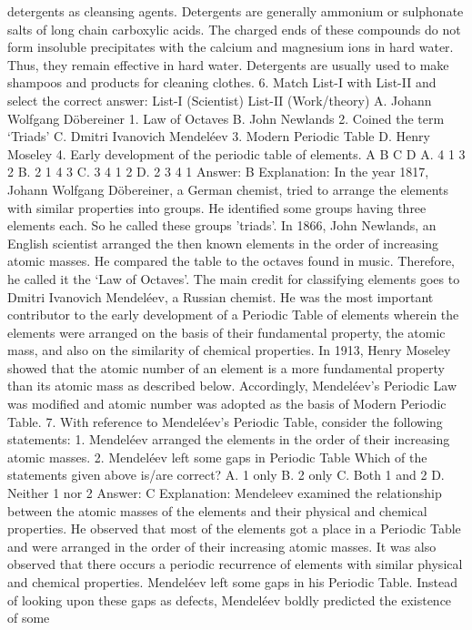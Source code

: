 detergents as cleansing agents. Detergents are generally ammonium
or sulphonate salts of long chain carboxylic acids. The charged ends
of these compounds do not form insoluble precipitates with the
calcium and magnesium ions in hard water. Thus, they remain
effective in hard water. Detergents are usually used to make
shampoos and products for cleaning clothes.
6. Match List-I with List-II and select the correct answer:
List-I (Scientist) List-II (Work/theory)
A. Johann Wolfgang Döbereiner 1. Law of Octaves
B. John Newlands 2. Coined the term ‘Triads’
C. Dmitri Ivanovich Mendeléev 3. Modern Periodic Table
D. Henry Moseley 4. Early development of the periodic table of
elements.
A B C D
A. 4 1 3 2
B. 2 1 4 3
C. 3 4 1 2
D. 2 3 4 1
Answer: B
Explanation:
In the year 1817, Johann Wolfgang Döbereiner, a German chemist,
tried to arrange the elements with similar properties into groups. He
identified some groups having three elements each. So he called
these groups 'triads'.
In 1866, John Newlands, an English scientist arranged the then
known elements in the order of increasing atomic masses. He
compared the table to the octaves found in music. Therefore, he
called it the ‘Law of Octaves’.
The main credit for classifying elements goes to Dmitri Ivanovich
Mendeléev, a Russian chemist. He was the most important
contributor to the early development of a Periodic Table of elements
wherein the elements were arranged on the basis of their
fundamental property, the atomic mass, and also on the similarity of
chemical properties.
In 1913, Henry Moseley showed that the atomic number of an
element is a more fundamental property than its atomic mass as
described below. Accordingly, Mendeléev’s Periodic Law was modified
and atomic number was adopted as the basis of Modern Periodic
Table.
7. With reference to Mendeléev’s Periodic Table, consider the
following statements:
1. Mendeléev arranged the elements in the order of their increasing
atomic masses.
2. Mendeléev left some gaps in Periodic Table
Which of the statements given above is/are correct?
A. 1 only
B. 2 only
C. Both 1 and 2
D. Neither 1 nor 2
Answer: C
Explanation:
Mendeleev examined the relationship between the atomic masses of
the elements and their physical and chemical properties. He
observed that most of the elements got a place in a Periodic Table
and were arranged in the order of their increasing atomic masses. It
was also observed that there occurs a periodic recurrence of
elements with similar physical and chemical properties. Mendeléev
left some gaps in his Periodic Table. Instead of looking upon these
gaps as defects, Mendeléev boldly predicted the existence of some
